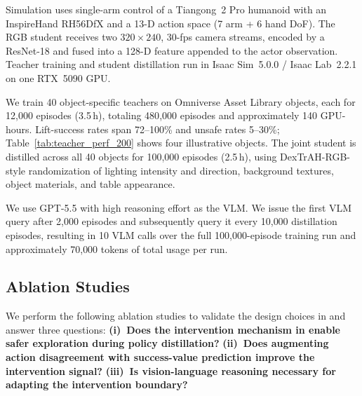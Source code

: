 

Simulation uses single-arm control of a Tiangong~2 Pro humanoid with an
InspireHand RH56DfX and a 13-D action space (7 arm + 6 hand DoF). The RGB
student receives two $320\times240$, 30-fps camera streams, encoded by a
ResNet-18 and fused into a 128-D feature appended to the actor
observation. Teacher training and student distillation run in Isaac Sim~5.0.0 /
Isaac Lab~2.2.1 on one RTX~5090 GPU.

We train 40 object-specific teachers on Omniverse Asset Library objects, each
for 12{,}000 episodes (3.5\,h), totaling 480{,}000 episodes and approximately
140 GPU-hours. Lift-success rates span 72--100\% and unsafe rates 5--30\%;
Table~\ref{tab:teacher_perf_200} shows four illustrative objects. The joint
student is distilled across all 40 objects for 100{,}000 episodes (2.5\,h),
using DexTrAH-RGB-style randomization of lighting intensity and direction,
background textures, object materials, and table appearance.

We use GPT-5.5 with high reasoning effort as the VLM. We issue the first VLM
query after 2{,}000 episodes
and subsequently query it every 10{,}000 distillation episodes, resulting in 10
VLM calls over the full 100{,}000-episode training run and approximately
70{,}000 tokens of total usage per run.

% 



\subsection{Ablation Studies}

We perform the following ablation studies to validate the design choices in
\methodname and answer three questions: \textbf{(i)~Does the intervention
mechanism in \dexsafedagger enable safer
exploration during policy distillation?} \textbf{(ii)~Does augmenting action
disagreement with success-value prediction improve the intervention signal?}
\textbf{(iii)~Is vision-language reasoning necessary for adapting the
intervention boundary?}

